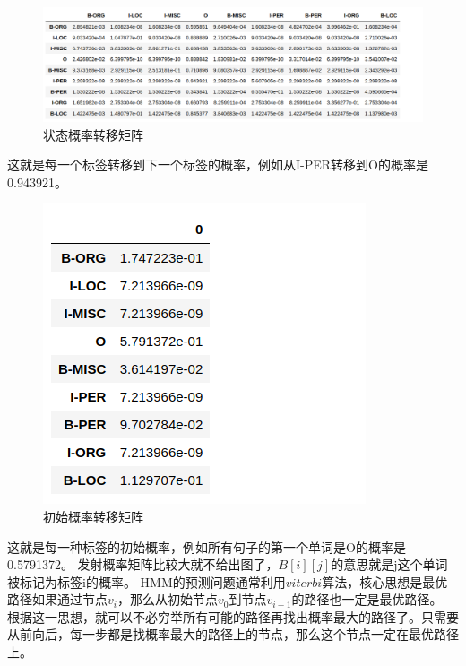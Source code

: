 \documentclass[openany,oneside]{ctexbook}
\begin{document}
\begin{figure}[htp]
   \centering
   \includegraphics[scale=0.5]{A.png}
   \caption{状态概率转移矩阵}
\end{figure}
这就是每一个标签转移到下一个标签的概率，例如从I-PER转移到O的概率是0.943921。
\begin{figure}[htp]
   \centering
   \includegraphics[scale=0.6]{pi.png}
   \caption{初始概率转移矩阵}
\end{figure}
这就是每一种标签的初始概率，例如所有句子的第一个单词是O的概率是0.5791372。
发射概率矩阵比较大就不给出图了，$B[i][j]$的意思就是j这个单词被标记为标签i的概率。
HMM的预测问题通常利用$viterbi$算法，核心思想是最优路径如果通过节点$v_i$，那么从初始节点$v_0$到节点$v_{i-1}$的路径也一定是最优路径。
根据这一思想，就可以不必穷举所有可能的路径再找出概率最大的路径了。只需要从前向后，每一步都是找概率最大的路径上的节点，那么这个节点一定在最优路径上。
\end{document}
